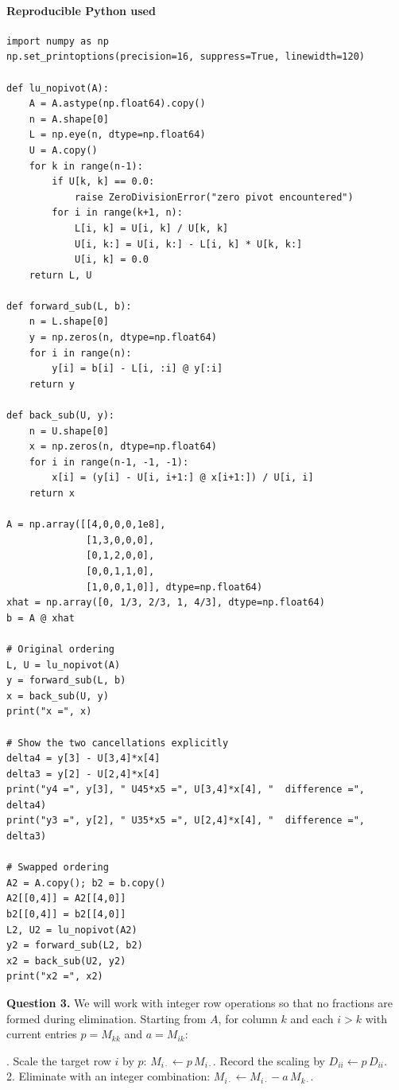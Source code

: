 \documentclass[11pt]{article}
\begin{document}
\paragraph{Reproducible Python used}
\begin{verbatim}
import numpy as np
np.set_printoptions(precision=16, suppress=True, linewidth=120)

def lu_nopivot(A):
    A = A.astype(np.float64).copy()
    n = A.shape[0]
    L = np.eye(n, dtype=np.float64)
    U = A.copy()
    for k in range(n-1):
        if U[k, k] == 0.0:
            raise ZeroDivisionError("zero pivot encountered")
        for i in range(k+1, n):
            L[i, k] = U[i, k] / U[k, k]
            U[i, k:] = U[i, k:] - L[i, k] * U[k, k:]
            U[i, k] = 0.0
    return L, U

def forward_sub(L, b):
    n = L.shape[0]
    y = np.zeros(n, dtype=np.float64)
    for i in range(n):
        y[i] = b[i] - L[i, :i] @ y[:i]
    return y

def back_sub(U, y):
    n = U.shape[0]
    x = np.zeros(n, dtype=np.float64)
    for i in range(n-1, -1, -1):
        x[i] = (y[i] - U[i, i+1:] @ x[i+1:]) / U[i, i]
    return x

A = np.array([[4,0,0,0,1e8],
              [1,3,0,0,0],
              [0,1,2,0,0],
              [0,0,1,1,0],
              [1,0,0,1,0]], dtype=np.float64)
xhat = np.array([0, 1/3, 2/3, 1, 4/3], dtype=np.float64)
b = A @ xhat

# Original ordering
L, U = lu_nopivot(A)
y = forward_sub(L, b)
x = back_sub(U, y)
print("x =", x)

# Show the two cancellations explicitly
delta4 = y[3] - U[3,4]*x[4]
delta3 = y[2] - U[2,4]*x[4]
print("y4 =", y[3], " U45*x5 =", U[3,4]*x[4], "  difference =", delta4)
print("y3 =", y[2], " U35*x5 =", U[2,4]*x[4], "  difference =", delta3)

# Swapped ordering
A2 = A.copy(); b2 = b.copy()
A2[[0,4]] = A2[[4,0]]
b2[[0,4]] = b2[[4,0]]
L2, U2 = lu_nopivot(A2)
y2 = forward_sub(L2, b2)
x2 = back_sub(U2, y2)
print("x2 =", x2)
\end{verbatim}


\newpage



{\bf Question 3.}
We will work with integer row operations so that no fractions are formed during elimination. Starting from \(A\), for column \(k\) and each \(i>k\) with current entries \(p=M_{kk}\) and \(a=M_{ik}\):

. Scale the target row \(i\) by \(p\): \(M_{i\cdot}\leftarrow p\,M_{i\cdot}\). Record the scaling by \(D_{ii}\leftarrow p\,D_{ii}\).\\
2. Eliminate with an integer combination: \(M_{i\cdot}\leftarrow M_{i\cdot}-a\,M_{k\cdot}\).
\end{document}
